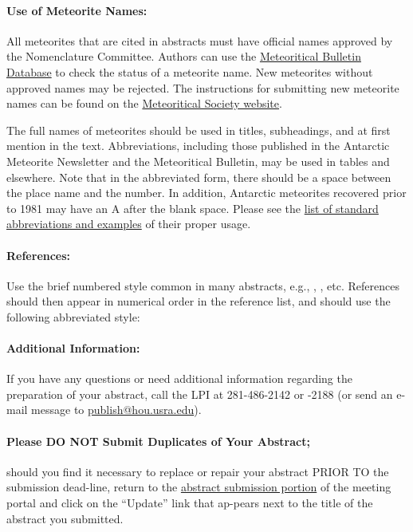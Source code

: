 \documentclass{lpsc_abstract}
\begin{document}
\paragraph{Use of Meteorite Names:}
All meteorites that are cited in abstracts must have official names approved by the Nomenclature Committee. Authors can use the \href{http://www.lpi.usra.edu/meteor/}{Meteoritical Bulletin Database} to check the status of a meteorite name. New meteorites without approved names may be rejected. The instructions for submitting new meteorite names can be found on the \href{http://meteoriticalsociety.org/?page_id=63}{Meteoritical Society website}.

The full names of meteorites should be used in titles, subheadings, and at first mention in the text. Abbreviations, including those published in the Antarctic Meteorite Newsletter and the Meteoritical Bulletin, may be used in tables and elsewhere. Note that in the abbreviated form, there should be a space between the place name and the number.
In addition, Antarctic meteorites recovered prior to 1981 may have an A after the blank space. Please see the \href{http://meteoriticalsociety.org/?page_id=61}{list of standard abbreviations and examples} of their proper usage.

\paragraph{References:}
Use the brief numbered style common in many abstracts, e.g., \cite{article1}, \cite{article2}, etc. References should then appear in numerical order in the reference list, and should use the following abbreviated style:
\nocite{article3,article4}



\paragraph{Additional Information:}
If you have any questions or need additional information
regarding the preparation of your abstract, call the LPI at 281-486-2142
or -2188 (or send an e-mail message to \href{mailto:publish@hou.usra.edu}{publish@hou.usra.edu}).

\paragraph{Please DO NOT Submit Duplicates of Your Abstract;} should you find it necessary to replace or repair your abstract PRIOR TO the submission dead-line, return to the \href{https://www.hou.usra.edu/meeting_portal/abstract_submission/}{abstract submission portion} of the meeting portal and click on the “Update” link that ap-pears next to the title of the abstract you submitted.
 
\end{document}
